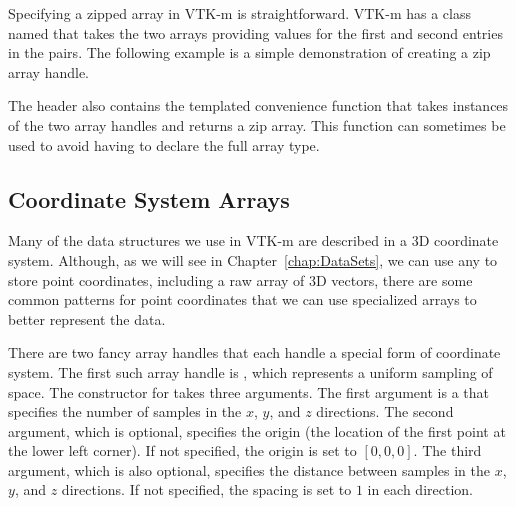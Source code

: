 Specifying a zipped array in VTK-m is straightforward. VTK-m has a class
named  that takes the two arrays providing values
for the first and second entries in the pairs. The following example is a
simple demonstration of creating a zip array handle.


The  header also contains the
templated convenience function  that takes
instances of the two array handles and returns a zip array. This function
can sometimes be used to avoid having to declare the full array type.



\subsection{Coordinate System Arrays}
\label{sec:CoordinateSystemArrays}

Many of the data structures we use in VTK-m are described in a 3D
coordinate system. Although, as we will see in Chapter~\ref{chap:DataSets},
we can use any  to store point coordinates,
including a raw array of 3D vectors, there are some common patterns for
point coordinates that we can use specialized arrays to better represent
the data.


There are two fancy array handles that each handle a special form of
coordinate system. The first such array handle is
, which represents a uniform
sampling of space. The constructor for
 takes three arguments.
The first argument is a  that specifies the number of samples in
the $x$, $y$, and $z$ directions. The second argument, which is optional,
specifies the origin (the location of the first point at the lower left
corner). If not specified, the origin is set to $[0,0,0]$. The third
argument, which is also optional, specifies the distance between samples in
the $x$, $y$, and $z$ directions. If not specified, the spacing is set to
$1$ in each direction.

